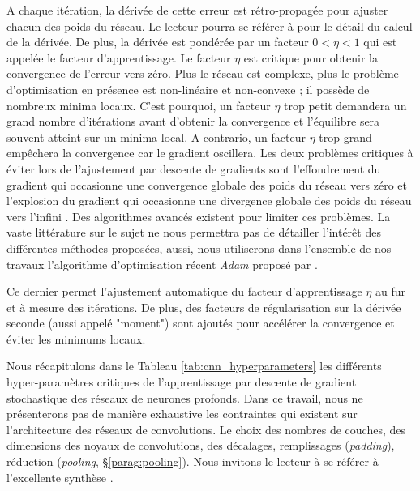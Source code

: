 A chaque itération, la dérivée de cette erreur est rétro-propagée pour ajuster chacun des poids du réseau.
Le lecteur pourra se référer à \cite{sadowski_notes_2016} pour le détail du calcul de la dérivée.
De plus, la dérivée est pondérée par un facteur $0 < \eta < 1$ qui est appelée le facteur d'apprentissage.
Le facteur $\eta$ est critique pour obtenir la convergence de l'erreur vers zéro.
Plus le réseau est complexe, plus le problème d'optimisation en présence est non-linéaire et non-convexe ; il possède de nombreux minima locaux.
C'est pourquoi, un facteur $\eta$ trop petit demandera un grand nombre d'itérations avant d'obtenir la convergence et l'équilibre sera souvent atteint sur un minima local.
A contrario, un facteur $\eta$ trop grand empêchera la convergence car le gradient oscillera.
Les deux problèmes critiques à éviter lors de l'ajustement par descente de gradients sont l'effondrement du gradient qui occasionne une convergence globale des poids du réseau vers zéro et l'explosion du gradient qui occasionne une divergence globale des poids du réseau vers l'infini \cite{bengio_learning_1994, hochreiter_gradient_2001}.
Des algorithmes avancés existent pour limiter ces problèmes.
La vaste littérature sur le sujet ne nous permettra pas de détailler l'intérêt des différentes méthodes proposées, aussi, nous utiliserons dans l'ensemble de nos travaux l'algorithme d'optimisation récent \textit{Adam} proposé par \cite{kingma_adam_2014}.

Ce dernier permet l'ajustement automatique du facteur d'apprentissage  $\eta$ au fur et à mesure des itérations.
De plus, des facteurs de régularisation sur la dérivée seconde (aussi appelé "moment") sont ajoutés pour accélérer la convergence et éviter les minimums locaux.

Nous récapitulons dans le Tableau \ref{tab:cnn_hyperparameters} les différents hyper-paramètres critiques de l'apprentissage par descente de gradient stochastique des réseaux de neurones profonds. Dans ce travail, nous ne présenterons pas de manière exhaustive les contraintes qui existent sur l'architecture des réseaux de convolutions. Le choix des nombres de couches, des dimensions des noyaux de convolutions, des décalages, remplissages (\textit{padding}), réduction (\textit{pooling}, §\ref{parag:pooling}). Nous invitons le lecteur à se référer à l'excellente synthèse \cite{dumoulin_guide_2016}.

